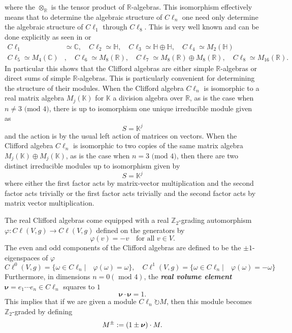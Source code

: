 \documentclass[openany, 11pt]{article}
\theoremstyle{definition}
\theoremstyle{remark}
\def\lp{\ensuremath{\left(}}
\def\rp{\ensuremath{\right)}}
\def\bC{\ensuremath{\mathbb{C}}}
\def\bH{\ensuremath{\mathbb{H}}}
\def\bR{\ensuremath{\mathbb{R}}}
\def\bZ{\ensuremath{\mathbb{Z}}}
\def\bK{\ensuremath{\mathbb{K}}}
\begin{document}
where the $\otimes_{\bR}$ is the tensor product of $\bR$-algebras. This isomorphism effectively means that to determine the algebraic structure of $C\ell_n$ one need only determine the algebraic structure of $C\ell_1$ through $C\ell_8$. This is very well known and can be done explicitly as seen in \cite{ABS} or \cite{LM}
\begin{align*}
    C\ell_1&\simeq\bC,\quad
    C\ell_2\simeq\bH,\quad
    C\ell_3\simeq\bH\oplus\bH,\quad
    C\ell_4\simeq M_2(\bH)\\
    C\ell_5\simeq M_4(\bC)&,\quad
    C\ell_6\simeq M_8(\bR),\quad
    C\ell_7\simeq M_8(\bR)\oplus M_8(\bR),\quad
    C\ell_8\simeq M_{16}(\bR).
\end{align*}
In particular this shows that the Clifford algebras are either simple $\bR$-algebras or direct sums of simple $\bR$-algebras. This is particularly convenient for determining the structure of their modules. When the Clifford algebra $C\ell_n$ is isomorphic to a real matrix algebra $M_j(\bK)$ for $\bK$ a division algebra over $\bR$, as is the case when $n\neq 3\text{ (mod $4$)}$, there is up to isomorphism one unique irreducible module given as
\[
    S=\bK^j
\]
and the action is by the usual left action of matrices on vectors. When the Clifford algebra $C\ell_n$ is isomorphic to two copies of the same matrix algebra $M_j(\bK)\oplus M_j(\bK)$, as is the case when $n=3\text{ (mod $4$)}$, then there are two distinct irreducible modules up to isomorphism given by
\[
    S=\bK^j
\]
where either the first factor acts by matrix-vector multiplication and the second factor acts trivially or the first factor acts trivially and the second factor acts by matrix vector multiplication.\par
The real Clifford algebras come equipped with a real $\bZ_2$-grading automorphism $\varphi:C\ell(V,g)\rightarrow C\ell(V,g)$ defined on the generators by
\[
    \varphi(v)=-v\quad\text{for all }v\in V.
\]
The even and odd components of the Clifford algebras are defined to be the $\pm1$-eigenspaces of $\varphi$
\[
    C\ell^0(V,g)=\bigl\{ \omega\in C\ell_n\big|\quad\varphi(\omega)= \omega\bigr\},\quad C\ell^1(V,g)=\bigl\{ \omega\in C\ell_n\big|\quad\varphi(\omega)=- \omega\bigr\}
\]
Furthermore, in dimensions $n=0(\text{ mod } 4)$, the \textbf{\emph{real volume element}} $\boldsymbol{\nu}=e_1\cdots e_n\in C\ell_n$ squares to $1$
\[
    \boldsymbol{\nu}\cdot\boldsymbol{\nu}=1.
\]
This implies that if we are given a module $C\ell_n\circlearrowright M$, then this module becomes $\bZ_2$-graded by defining
\[
    M^{\pm}:=\lp 1\pm\boldsymbol{\nu}\rp\cdot M.
\]
\end{document}
